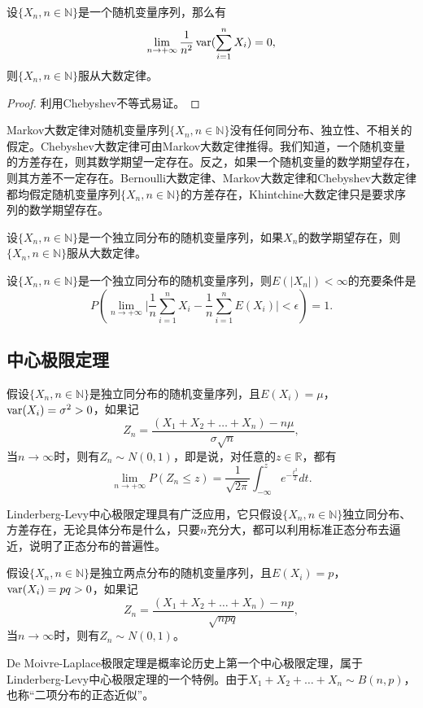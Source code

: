 \begin{theorem}[Markov大数定律]
设$\{X_n, n\in \mathbb N\}$是一个随机变量序列，那么有
\[
    \lim\limits_{n\rightarrow +\infty}\frac{1}{n^2} \operatorname{\mathrm{var}}(\sum\limits_{i=1}^n X_i) = 0,
\]
则$\{X_n, n\in \mathbb N\}$服从大数定律。
\end{theorem}
\begin{proof}
利用Chebyshev不等式易证。
\end{proof}
Markov大数定律对随机变量序列$\{X_n, n\in \mathbb N\}$没有任何同分布、独立性、不相关的假定。Chebyshev大数定律可由Markov大数定律推得。我们知道，一个随机变量的方差存在，则其数学期望一定存在。反之，如果一个随机变量的数学期望存在，则其方差不一定存在。Bernoulli大数定律、Markov大数定律和Chebyshev大数定律都均假定随机变量序列$\{X_n, n\in \mathbb N\}$的方差存在，Khintchine大数定律只是要求序列的数学期望存在。

\begin{theorem}[Khintchine大数定律]%
设$\{X_n, n\in \mathbb N\}$是一个独立同分布的随机变量序列，如果$X_n$的数学期望存在，则$\{X_n, n\in \mathbb N\}$服从大数定律。
\end{theorem}

\begin{theorem}[Kolmogorov强大数定律]
设$\{X_n, n\in \mathbb N\}$是一个独立同分布的随机变量序列，则$E(|X_n|)<\infty$的充要条件是
\[
    P(\lim\limits_{n\rightarrow +\infty} \big|\frac{1}{n} \sum\limits_{i=1}^n X_i-\frac{1}{n} \sum\limits_{i=1}^n E(X_i)\big|<\epsilon) = 1.
\]
\end{theorem}

\subsection{中心极限定理}%
\begin{theorem}
假设$\{X_n,n\in \mathbb N\}$是独立同分布的随机变量序列，且$E(X_i)=\mu$，$\operatorname{\mathrm{var}}(X_i)=\sigma^2>0$，如果记
\[
    Z_n = \frac{(X_1 + X_2 + \ldots + X_n) - n\mu}{\sigma \sqrt n},
\]
当$n\rightarrow\infty$时，则有$Z_n\sim N(0,1)$，即是说，对任意的$z\in \mathbb R$，都有
\[
    \lim\limits_{n\rightarrow +\infty} P(Z_n \le z) = \frac{1}{\sqrt{2\pi}}\int_{-\infty}^z e^{-\frac{t^2}{2}}dt.
\]
\end{theorem}
Linderberg-Levy中心极限定理具有广泛应用，它只假设$\{X_n,n\in \mathbb N\}$独立同分布、方差存在，无论具体分布是什么，只要$n$充分大，都可以利用标准正态分布去逼近，说明了正态分布的普遍性。

\begin{theorem}
假设$\{X_n,n\in \mathbb N\}$是独立两点分布的随机变量序列，且$E(X_i)=p$，$\operatorname{\mathrm{var}}(X_i)=pq>0$，如果记
\[
    Z_n = \frac{(X_1 + X_2 + \ldots + X_n) - np}{\sqrt{npq}},
\]
当$n\rightarrow\infty$时，则有$Z_n\sim N(0,1)$。
\end{theorem}
De Moivre-Laplace极限定理是概率论历史上第一个中心极限定理，属于Linderberg-Levy中心极限定理的一个特例。由于$X_1 + X_2 + \ldots + X_n\sim B(n,p)$，也称“二项分布的正态近似”。

